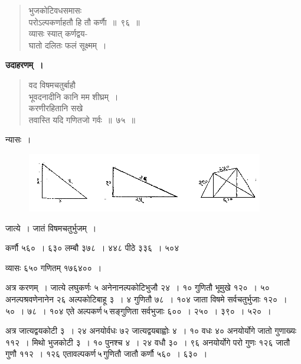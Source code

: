 \documentclass[11pt, openany]{book}
\begin{document}
\begin{quote}
    \bs 
भुजकोटिवधसमासः \\
परोऽल्पकर्णाहतौ हि तौ कर्णाै~॥~९६~॥ \\
व्यासः स्यात् कर्णद्वय-\\
घातो दलितः फलं सूक्ष्मम्~।
\end{quote}

 \textbf{उदाहरणम्~।} 
\begin{quote}
    \bqt 
वद विषमचतुर्बाहौ \\
भूवदनादीनि कानि मम शीघ्रम्~।\\
करणीरहितानि सखे \\
तवास्ति यदि गणितजो गर्वः~॥~७५~॥
\end{quote}

 न्यासः~। 
\vspace{-3mm}

\begin{figure}[h!]
    \centering
    \includegraphics[scale=0.85]{graphics/capture115.png}
\end{figure}
\vspace{-4mm}

 जात्ये~। जातं विषमचतुर्भुजम्~। 

\newpage%

कर्णौ ५६०~। ६३० लम्बौ ३७८~। ४४८ पीठे ३३६~। ५०४\\
\vspace{-4mm}

व्यासः ६५० गणितम् १७६४००~। \\
\vspace{-4mm}

 अत्र करणम्~। जात्ये लघुकर्णः ५ अनेनानल्पकोटिभुजौ
२४~। १० गुणितौ भूमुखे १२०~। ५० अनल्पश्रवणेनानेन २६ अल्पकोटिबाहू ३~। ४ गुणितौ ७८~। १०४ जाता विषमे सर्वचतुर्भुजाः १२०~। ५०~।
७८~। १०४ एते अल्पकर्ण\textendash \,५\textendash \,सङ्गुणिता सर्वभुजाः ६००~। २५०~। ३९०~। ५२०~। \\
\vspace{-4mm}

 अत्र जात्यद्वयकोटी ३~। २४ अनयोर्वधः ७२ जात्यद्वयबाह्वोः ४~। १०
वधः ४० अनयोर्योगे जातो गुणाख्यः ११२~। मिथो भुजकोटी ३~। १०
पुनश्च ४~। २४ वधौ ३०~। ९६ अनयोर्योगे परो गुणः १२६ जातौ गुणौ
११२~। १२६ एतावल्पकर्ण\textendash \,५\textendash \,गुणितौ जातौ कर्णौ ५६०~। ६३०~। \\
\vspace{-4mm}
\end{document}
